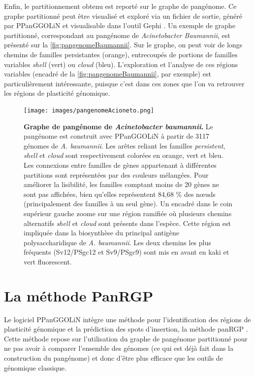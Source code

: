 Enfin, le partitionnement obtenu est reporté sur le graphe de pangénome. Ce graphe partitionné peut être visualisé et exploré via un fichier de sortie, généré par PPanGGOLiN et visualisable dans l'outil Gephi \cite{bastian_gephi_2009}. Un exemple de graphe partitionné, correspondant au pangénome de \textit{Acinetobacter Baumannii}, est présenté sur la \autoref{fig:pangenomeBaumannii}. Sur le graphe, on peut voir de longs chemins de familles persistantes (orange), entrecoupés de portions de familles variables \textit{shell} (vert) ou \textit{cloud} (bleu). L'exploration et l'analyse de ces régions variables (encadré de la \autoref{fig:pangenomeBaumannii}, par exemple) est particulièrement intéressante, puisque c'est dans ces zones que l'on va retrouver les régions de plasticité génomique.

\begin{figure}[htbp]
    \centering
    \texttt{[image: images/pangenomeAcioneto.png]}
    \caption[Graphe de pangénome de \textit{Acinetobacter baumannii}]{\textbf{Graphe de pangénome de \textit{Acinetobacter baumannii}.} Le pangénome est construit avec PPanGGOLiN à partir de 3117 génomes de \textit{A. baumannii}. Les arêtes reliant les familles \textit{persistent}, \textit{shell} et \textit{cloud} sont respectivement colorées en orange, vert et bleu. Les connexions entre familles de gènes appartenant à différentes partitions sont représentées par des couleurs mélangées. Pour améliorer la lisibilité, les familles comptant moins de 20 gènes ne sont pas affichées, bien qu'elles représentent 84,68 \% des n\oe uds (principalement des familles à un seul gène). Un encadré dans le coin supérieur gauche zoome sur une région ramifiée où plusieurs chemins alternatifs \textit{shell} et \textit{cloud} sont présents dans l'espèce. Cette région est impliquée dans la biosynthèse du principal antigène polysaccharidique de \textit{A. baumannii}. Les deux chemins les plus fréquents (Sv12/PSgc12 et Sv9/PSgc9) sont mis en avant en kaki et vert fluorescent.}
    \label{fig:pangenomeBaumannii}
\end{figure}

\section{La méthode PanRGP}

Le logiciel PPanGGOLiN intègre une méthode pour l'identification des régions de plasticité génomique et la prédiction des spots d'insertion, la méthode panRGP \cite{bazin_panrgp_2020}. Cette méthode repose sur l'utilisation du graphe de pangénome partitionné pour ne pas avoir à comparer l'ensemble des génomes (ce qui est déjà fait dans la construction du pangénome) et donc d'être plus efficace que les outils de génomique classique.

